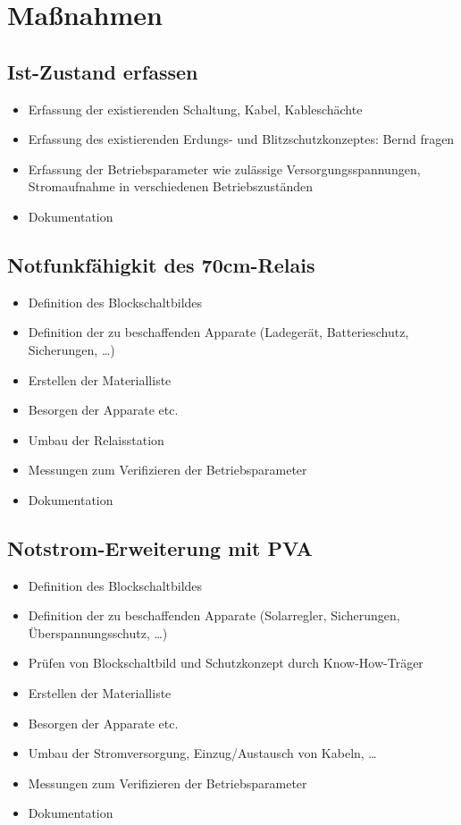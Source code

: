 \documentclass[a4paper]{scrartcl}
\begin{document}
\section{Ma\ss{}nahmen}
\subsection{Ist-Zustand erfassen}
\begin{itemize}
    \item Erfassung der existierenden Schaltung, Kabel, Kablesch\"achte
    \item Erfassung des existierenden Erdungs- und Blitzschutzkonzeptes: Bernd fragen
    \item Erfassung der Betriebsparameter wie zul\"assige Versorgungsspannungen, Stromaufnahme in verschiedenen Betriebszust\"anden
    \item Dokumentation
\end{itemize}

\subsection{Notfunkf\"ahigkit des 70cm-Relais}
\begin{itemize}
    \item Definition des Blockschaltbildes
    \item Definition der zu beschaffenden Apparate (Ladeger\"at, Batterieschutz, Sicherungen, \dots )
    \item Erstellen der Materialliste
    \item Besorgen der Apparate etc.
    \item Umbau der Relaisstation
    \item Messungen zum Verifizieren der Betriebsparameter
    \item Dokumentation
\end{itemize}

\subsection{Notstrom-Erweiterung mit PVA}
\begin{itemize}
    \item Definition des Blockschaltbildes
    \item Definition der zu beschaffenden Apparate (Solarregler, Sicherungen, \"Uberspannungsschutz, \dots)
    \item Pr\"ufen von Blockschaltbild und Schutzkonzept durch Know-How-Tr\"ager
    \item Erstellen der Materialliste
    \item Besorgen der Apparate etc.
    \item Umbau der Stromversorgung, Einzug/Austausch von Kabeln, \dots
    \item Messungen zum Verifizieren der Betriebsparameter
    \item Dokumentation
\end{itemize}
\end{document}
